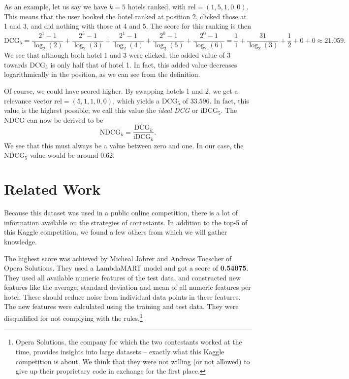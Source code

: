 \documentclass[runningheads,a4paper]{llncs}
\begin{document}
As an example, let us say we have $k=5$ hotels ranked, with 
$\text{rel} = (1,5,1,0,0)$.  This means that the user booked the hotel ranked at 
position 2, clicked those at 1 and 3, and did nothing with those at 4 and 5. The 
score for this ranking is then
\[
  \text{DCG}_5 = 
    \frac{2^1-1}{\log_2(2)} + \frac{2^5 - 1}{\log_2(3)} + \frac{2^1 - 1}{\log_2(4)} + 
    \frac{2^0 - 1}{\log_2(5)} + \frac{2^0 - 1}{\log_2(6)} = 
    \frac{1}{1} + \frac{31}{\log_2(3)} + \frac{1}{2} + 0 + 0 \approx 21.059.
\]
We see that although both hotel 1 and 3 were clicked, the added value of 3 
towards $\text{DCG}_5$ is only half that of hotel 1. In fact, this added value 
decreases logarithmically in the position, as we can see from the definition.

Of course, we could have scored higher. By swapping hotels 1 and 2, we get a 
relevance vector $\text{rel} = (5,1,1,0,0)$, which yields a $\text{DCG}_5$ of 
$33.596$. In fact, this value is the highest possible; we call this value the 
\emph{ideal DCG} or $\text{iDCG}_5$. The NDCG can now be derived to be
\[
\text{NDCG}_k = \frac{\text{DCG}_k}{\text{iDCG}_k}.
\]
We see that this must always be a value between zero and one. In our case, the 
$\text{NDCG}_5$ value would be around $0.62$.

\section{Related Work}
\label{sec:relwork}
Because this dataset was used in a public online competition, there is a lot of 
information available on the strategies of contestants. In addition to the top-5 
of this Kaggle competition, we found a few others from which we will gather knowledge.

The highest score was achieved by Micheal Jahrer and Andreas Toescher of Opera 
Solutions.\cite{wind} They used a LambdaMART model and got a score of \textbf{0.54075}. 
They used all available numeric features of the test data, and constructed new 
features like the average, standard deviation and mean of all numeric features 
per hotel. These should reduce noise from individual data points in these features. 
The new features were calculated using the training and test data. 
They were disqualified for not complying with the rules.\footnote{Opera Solutions, 
  the company for which the two contestants worked at the time, provides insights 
  into large datasets -- exactly what this Kaggle competition is about. We think 
  that they were not willing (or not allowed) to give up their proprietary code 
  in exchange for the first place.}
\end{document}
